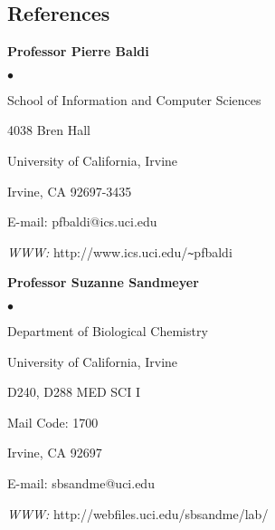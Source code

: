\documentclass[margin,line]{res}
\newenvironment{list2}{
  \begin{list}{$\bullet$}{%
      \setlength{\itemsep}{0in}
      \setlength{\parsep}{0in} \setlength{\parskip}{0in}
      \setlength{\topsep}{0in} \setlength{\partopsep}{0in} 
      \setlength{\leftmargin}{0.2in}}}{\end{list}}
\begin{document}
\begin{resume}
        \section{\sc References} 
        \textbf{Professor Pierre Baldi}
        \begin{list2}
          \item[] School of Information and Computer Sciences
          \item[] 4038 Bren Hall
          \item[] University of California, Irvine
          \item[] Irvine, CA 92697-3435
          \item[] E-mail: pfbaldi@ics.uci.edu
          \item[] {\it WWW:} http://www.ics.uci.edu/\verb+~+pfbaldi
        \end{list2}

        \textbf{Professor Suzanne Sandmeyer}
        \begin{list2}
          \item[] Department of Biological Chemistry
          \item[] University of California, Irvine
          \item[] D240, D288 MED SCI I
          \item[] Mail Code: 1700
          \item[] Irvine, CA 92697
          \item[] E-mail: sbsandme@uci.edu
          \item[] {\it WWW:} http://webfiles.uci.edu/sbsandme/lab/
        \end{list2}

\end{resume}
\end{document}
